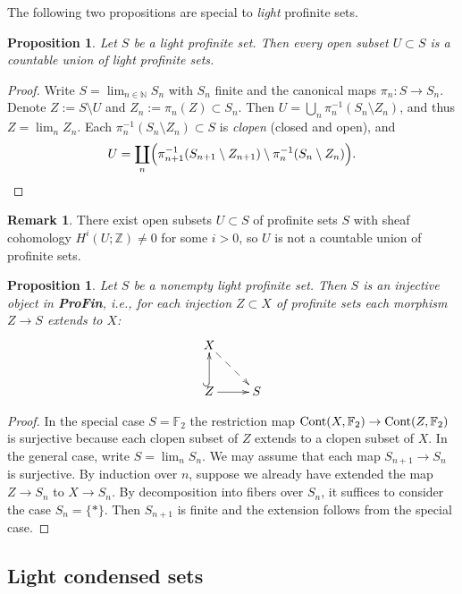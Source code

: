 \documentclass[12pt,a4paper]{amsart}
\newtheorem{prop}[PARA]{Proposition}
\theoremstyle{definition}
\newtheorem{rem}[PARA]{Remark}
\theoremstyle{theorem}
\newcommand{\F}{{\mathbb{F}}}
\newcommand{\N}{{\mathbb{N}}}
\newcommand{\Z}{{\mathbb{Z}}}
\newcommand{\Cont}{{\rm Cont}}
\begin{document}
The following two propositions are special to {\em light} profinite
sets. 

\begin{prop}
Let $S$ be a {\em light} profinite set. Then every open subset $U\subset S$
is a countable union of light profinite sets. 
\end{prop}

\begin{proof}
Write $S=\lim_{n\in\N}S_n$ with $S_n$ finite and the canonical maps
$\pi_n:S\to S_n$. Denote $Z:=S\setminus U$ and $Z_n:=\pi_n(Z)\subset S_n$.
Then $U=\bigcup_n\pi_n^{-1}(S_n\setminus Z_n)$, and thus $Z=\lim_nZ_n$. 
Each $\pi_n^{-1}(S_n\setminus Z_n)\subset S$ is {\em clopen} (closed
and open), and
$$
  U = \coprod_n\Bigl(\pi_{n+1}^{-1}(S_{n+1}\setminus Z_{n+1})\setminus
  \pi_n^{-1}(S_n\setminus Z_n)\Bigr).
$$
\end{proof}

\begin{rem}
There exist open subsets $U\subset S$ of profinite sets $S$ with
sheaf cohomology $H^i(U;\Z)\neq 0$ for some $i>0$, so $U$ is not 
a countable union of profinite sets.
\end{rem}

\begin{prop}
Let $S$ be a nonempty {\em light} profinite set. Then $S$ is an
injective object in {\bf ProFin}, i.e., for each injection $Z\subset
X$ of profinite sets each morphism $Z\to S$ extends to $X$: 
$$
\xymatrix{
  X \ar@{-->}[rd] \\ 
  Z \ar@{^{(}->}[u] \ar[r] & S
}
$$
\end{prop}

\begin{proof}
In the special case $S=\F_2$ the restriction map
$\Cont(X,\F_2)\to\Cont(Z,\F_2)$ is surjective because each clopen
subset of $Z$ extends to a clopen subset of $X$. 
In the general case, write $S=\lim_n S_n$. We may assume that each map
$S_{n+1}\to S_n$ is surjective. By induction over $n$, suppose we
already have extended the map $Z\to S_n$ to $X\to S_n$. By
decomposition into fibers over $S_n$, it suffices to consider the case
$S_n=\{*\}$. Then $S_{n+1}$ is finite and the extension follows
from the special case. 
\end{proof}

\subsection{Light condensed sets}
\end{document}
